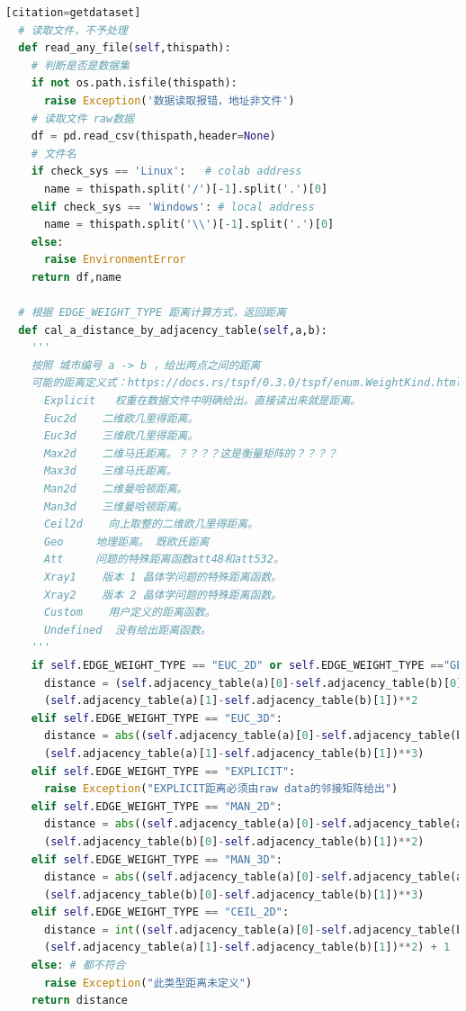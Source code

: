 \documentclass[lang=cn,11pt]{elegantpaper}
\begin{document}
\begin{lstlisting}[language=python][citation=getdataset]
  # 读取文件，不予处理
  def read_any_file(self,thispath):
    # 判断是否是数据集
    if not os.path.isfile(thispath):
      raise Exception('数据读取报错，地址非文件')
    # 读取文件 raw数据
    df = pd.read_csv(thispath,header=None)
    # 文件名
    if check_sys == 'Linux':   # colab address
      name = thispath.split('/')[-1].split('.')[0]
    elif check_sys == 'Windows': # local address 
      name = thispath.split('\\')[-1].split('.')[0]
    else:
      raise EnvironmentError
    return df,name
  
  # 根据 EDGE_WEIGHT_TYPE 距离计算方式，返回距离
  def cal_a_distance_by_adjacency_table(self,a,b):
    '''
    按照 城市编号 a -> b ，给出两点之间的距离
    可能的距离定义式：https://docs.rs/tspf/0.3.0/tspf/enum.WeightKind.html
      Explicit   权重在数据文件中明确给出。直接读出来就是距离。
      Euc2d    二维欧几里得距离。
      Euc3d    三维欧几里得距离。
      Max2d    二维马氏距离。？？？？这是衡量矩阵的？？？？
      Max3d    三维马氏距离。
      Man2d    二维曼哈顿距离。
      Man3d    三维曼哈顿距离。
      Ceil2d    向上取整的二维欧几里得距离。
      Geo     地理距离。 既欧氏距离
      Att     问题的特殊距离函数att48和att532。
      Xray1    版本 1 晶体学问题的特殊距离函数。
      Xray2    版本 2 晶体学问题的特殊距离函数。
      Custom    用户定义的距离函数。
      Undefined  没有给出距离函数。
    '''
    if self.EDGE_WEIGHT_TYPE == "EUC_2D" or self.EDGE_WEIGHT_TYPE =="GEO":
      distance = (self.adjacency_table(a)[0]-self.adjacency_table(b)[0])**2+\
      (self.adjacency_table(a)[1]-self.adjacency_table(b)[1])**2
    elif self.EDGE_WEIGHT_TYPE == "EUC_3D":
      distance = abs((self.adjacency_table(a)[0]-self.adjacency_table(b)[0])**3+\
      (self.adjacency_table(a)[1]-self.adjacency_table(b)[1])**3)
    elif self.EDGE_WEIGHT_TYPE == "EXPLICIT":
      raise Exception("EXPLICIT距离必须由raw data的邻接矩阵给出")
    elif self.EDGE_WEIGHT_TYPE == "MAN_2D":
      distance = abs((self.adjacency_table(a)[0]-self.adjacency_table(a)[1])**2-\
      (self.adjacency_table(b)[0]-self.adjacency_table(b)[1])**2)
    elif self.EDGE_WEIGHT_TYPE == "MAN_3D":
      distance = abs((self.adjacency_table(a)[0]-self.adjacency_table(a)[1])**3-\
      (self.adjacency_table(b)[0]-self.adjacency_table(b)[1])**3)
    elif self.EDGE_WEIGHT_TYPE == "CEIL_2D":
      distance = int((self.adjacency_table(a)[0]-self.adjacency_table(b)[0])**2+\
      (self.adjacency_table(a)[1]-self.adjacency_table(b)[1])**2) + 1
    else: # 都不符合
      raise Exception("此类型距离未定义")
    return distance


\end{lstlisting}
\end{document}
